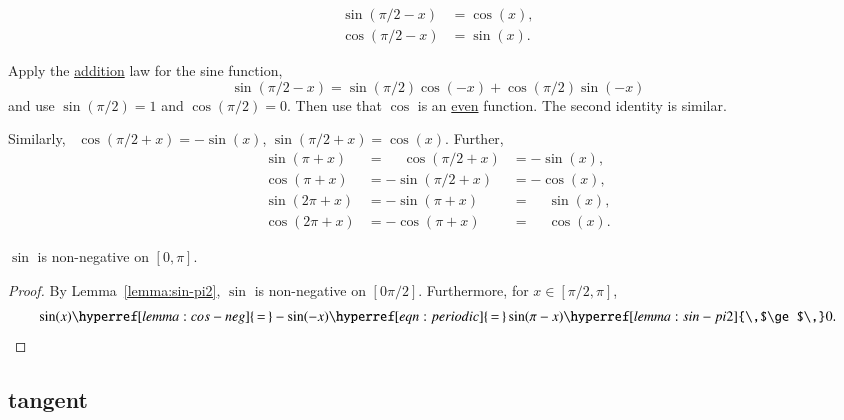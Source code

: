 \begin{lemma}\label{lemma:cos-sin}
    $$
   \begin{array}{rll}
    \sin(\pi/2 - x)  &= \cos(x),\\
     \cos(\pi/2 - x)&=\sin(x).
   \end{array}
    $$
\end{lemma}

\begin{proved}
    Apply the \hyperref[lemma:sin-add]{addition} law for the sine function,
    $$\sin(\pi/2 - x) = \sin(\pi/2)\cos(-x) + \cos(\pi/2)\sin(-x)$$
    and use
    \hyperref[lemma:sin-pi2]{$\sin(\pi/2) = 1$} and \hyperref[eqn:cospi2]{$\cos(\pi/2) = 0$}.  Then use that $\cos$ is
    an \hyperref[lemma:cos-neg]{even} function.  The second identity is similar.
\swallowed\end{proved}

Similarly,~%
%
$\cos(\pi/2 + x) =
-\sin(x)$, $\sin(\pi/2 + x) = \cos(x)$.  Further,
\begin{equation}\label{eqn:periodic}
\begin{array}{lll}
      \sin(\pi + x) &= \phantom{-}\cos(\pi/2 + x) &= -\sin(x),\\
      \cos(\pi + x) &= -\sin(\pi/2 + x) &= -\cos(x),\\
      \sin(2\pi + x) &= -\sin(\pi + x) &= \phantom{-}\sin(x),\\
      \cos(2\pi + x) &= -\cos(\pi + x) &= \phantom{-}\cos(x).
      \end{array}
\end{equation}
%
%

\begin{lemma}\guid{}\label{lemma:sin-pos}
  $\sin$ is non-negative on $[0,\pi]$.
\end{lemma}

\begin{proof} By Lemma~\ref{lemma:sin-pi2}, $\sin$ is non-negative on $[0\pi/2]$.
Furthermore, for $x\in[\pi/2,\pi]$,
$$
\sin(x) \hyperref[lemma:cos-neg]{\,=\,} -\sin(-x) 
\hyperref[eqn:periodic]{\,=\,}  \sin(\pi-x) \hyperref[lemma:sin-pi2]{\,$\ge$\,} 0.
$$
\end{proof}



\subsection{tangent}
\label{sec:tangent}

